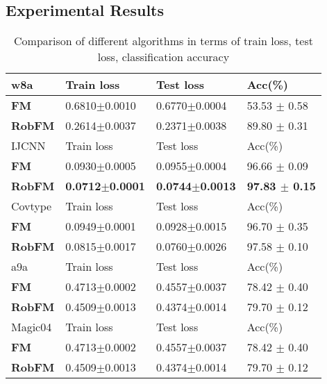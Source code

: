 \documentclass[letterpaper]{article} %
\begin{document}
\subsection{Experimental Results}
\begin{table*}
	\begin{tabu} to \textwidth {|X[c]| X[c]| X[c]| X[c]|}
		\hline
		w8a               & Train loss & Test loss & Acc(\%) \\
		\hline
		\textbf{FM} 	 &0.6810$\pm$0.0010  &0.6770$\pm$0.0004  & 53.53 $\pm$ 0.58   \\ \hline
		\textbf{RobFM}   &0.2614$\pm$0.0037  &0.2371$\pm$0.0038  & 89.80 $\pm$ 0.31  \\ \hline
		\hline
		IJCNN              & Train loss & Test loss & Acc(\%) \\
		\hline
		\textbf{FM} 	 &0.0930$\pm$0.0005  &0.0955$\pm$0.0004  & 96.66 $\pm$ 0.09 \\ \hline
		\textbf{RobFM} 	 &\textbf{0.0712$\pm$0.0001}  &\textbf{0.0744$\pm$0.0013}  & \textbf{97.83 $\pm$ 0.15}  \\ \hline
		\hline
		Covtype           & Train loss & Test loss & Acc(\%)  \\
		\hline
		\textbf{FM} 	  	&0.0949$\pm$0.0001 &0.0928$\pm$0.0015  &96.70 $\pm$ 0.35   \\ \hline
		\textbf{RobFM}   		&0.0815$\pm$0.0017  &0.0760$\pm$0.0026  &97.58 $\pm$ 0.10   \\ \hline
		\hline
		a9a               & Train loss & Test loss & Acc(\%)  \\
		\hline
		\textbf{FM} 			&0.4713$\pm$0.0002 &0.4557$\pm$0.0037  &78.42 $\pm$ 0.40   \\ \hline
		\textbf{RobFM}   		&0.4509$\pm$0.0013  &0.4374$\pm$0.0014  &79.70 $\pm$ 0.12   \\ \hline
		Magic04               & Train loss & Test loss & Acc(\%)  \\
		\hline
		\textbf{FM} 			&0.4713$\pm$0.0002 &0.4557$\pm$0.0037  &78.42 $\pm$ 0.40   \\ \hline
		\textbf{RobFM}   		&0.4509$\pm$0.0013  &0.4374$\pm$0.0014  &79.70 $\pm$ 0.12   \\ \hline
	\end{tabu}
	\caption{Comparison of different algorithms in terms of train loss, test loss, classification accuracy}
\end{table*}
\end{document}
